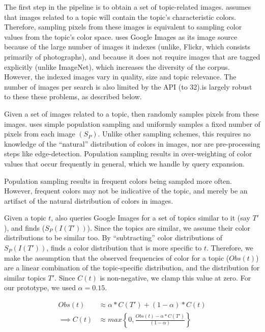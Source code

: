 
The first step in the \system pipeline is to obtain a set of topic-related images. \system assumes that images related to a topic will contain the topic's characteristic colors. Therefore, sampling pixels from these images is equivalent to sampling color values from the topic's color space. \system uses Google Images as its image source because of the large number of images it indexes (unlike, Flickr, which consists primarily of photographs), and because it does not require images that are tagged explicitly (unlike ImageNet), which increases the diversity of the corpus. However, the indexed images vary in quality, size and topic relevance. The number of images per search is also limited by the API (to 32).\system is largely robust to these these problems, as described below. 

Given a set of images related to a topic, \system then randomly samples pixels from these images. \system uses simple population sampling and uniformly samples a fixed number of pixels from each image $(S_{P})$. Unlike other sampling schemes, this requires no knowledge of the ``natural'' distribution of colors in images, nor are pre-processing steps like edge-detection. Population sampling results in over-weighting of color values that occur frequently in general, which we handle by query expansion.

Population sampling results in frequent colors being sampled more often. However, frequent colors may not be indicative of the topic, and merely be an artifact of the natural distribution of colors in images. 

Given a topic $t$, \system also queries Google Images for a set of topics similar to it (say $T'$), and finds ($S_{P}(I(T'))$). Since the topics are similar, we assume their color distributions to be similar too. By ``subtracting'' color distributions of $S_{P}(I(T'))$, \system finds a color distribution that is more specific to $t$. Therefore, we make the assumption that the observed frequencies of color for a topic ($Obs(t)$) are a linear combination of the topic-specific distribution, and the distribution for similar topics $T'$. Since $C(t)$ is non-negative, we clamp this value at zero. For our prototype, we used $\alpha = 0.15$.

\begin{align}
Obs(t) &\approx \alpha*C(T') + (1-\alpha)*C(t) \\
\label{linear-color}
\implies  C(t) &\approx max\left\{0,\frac{Obs(t) - \alpha*C(T')}{(1-\alpha)}\right\}
\end{align}

